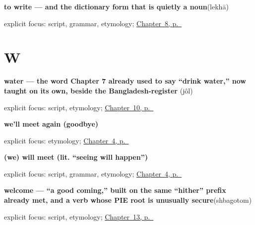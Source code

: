 \noindent\begin{minipage}[t]{\linewidth}
\raggedright
\textbf{to write — and the dictionary form that is quietly a noun}\enspace\emph{}\enspace(lekhā)\par
\footnotesize explicit focus: script, grammar, etymology; \hyperref[ch:bn-mind-and-page]{Chapter~8, p.~\pageref*{ch:bn-mind-and-page}}
\end{minipage}\par\smallskip

\section*{W}

\noindent\begin{minipage}[t]{\linewidth}
\raggedright
\textbf{water — the word Chapter 7 already used to say \textquotedblleft{}drink water,\textquotedblright{} now taught on its own, beside the Bangladesh-register }\enspace\emph{}\enspace(jôl)\par
\footnotesize explicit focus: script, etymology; \hyperref[ch:bn-tea-water-milk-rice]{Chapter~10, p.~\pageref*{ch:bn-tea-water-milk-rice}}
\end{minipage}\par\smallskip

\noindent\begin{minipage}[t]{\linewidth}
\raggedright
\textbf{we'll meet again (goodbye)}\enspace\emph{  }\par
\footnotesize explicit focus: etymology; \hyperref[ch:farewells]{Chapter~4, p.~\pageref*{ch:farewells}}
\end{minipage}\par\smallskip

\noindent\begin{minipage}[t]{\linewidth}
\raggedright
\textbf{(we) will meet (lit. \textquotedblleft{}seeing will happen\textquotedblright{})}\enspace\emph{ }\par
\footnotesize explicit focus: script, grammar, etymology; \hyperref[ch:farewells]{Chapter~4, p.~\pageref*{ch:farewells}}
\end{minipage}\par\smallskip

\noindent\begin{minipage}[t]{\linewidth}
\raggedright
\textbf{welcome — \textquotedblleft{}a good coming,\textquotedblright{} built on the same \textquotedblleft{}hither\textquotedblright{} prefix already met, and a verb whose PIE root is unusually secure}\enspace\emph{}\enspace(shbagotom)\par
\footnotesize explicit focus: script, etymology; \hyperref[ch:bn-please-sorry-welcome]{Chapter~13, p.~\pageref*{ch:bn-please-sorry-welcome}}
\end{minipage}\par\smallskip

